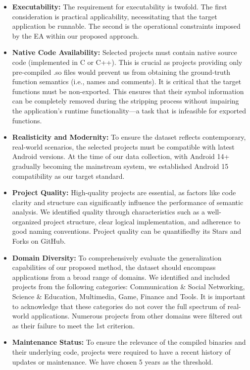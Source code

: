 \documentclass[acmsmall,screen,review,anonymous]{acmart} %
\begin{document}
\begin{itemize}
    \item \textbf{Executability:} The requirement for executability is twofold. The first consideration is practical applicability, necessitating that the target application be runnable. The second is the operational constraints imposed by the EA within our proposed approach.
    
    \item \textbf{Native Code  Availability:} Selected projects must contain native source code (implemented in C or C++). This is crucial as projects providing only pre-compiled .so files would prevent us from obtaining the ground-truth function semantics (i.e., names and comments). It is critical that the target functions must be non-exported. This ensures that their symbol information can be completely removed during the stripping process without impairing the application's runtime functionality—a task that is infeasible for exported functions.

    \item \textbf{Realisticity and Modernity:} To ensure the dataset reflects contemporary, real-world scenarios, the selected projects must be compatible with latest Android versions. At the time of our data collection, with Android 14+ gradually becoming the mainstream system, we established Android 15 compatibility as our target standard.

    \item \textbf{Project Quality:} High-quality projects are essential, as factors like code clarity and structure can significantly influence the performance of semantic analysis. We identified quality through characteristics such as a well-organized project structure, clear logical implementation, and adherence to good naming conventions. Project quality can be quantifiedby its Stars and Forks on GitHub.

    \item \textbf{Domain Diversity:} To comprehensively evaluate the generalization capabilities of our proposed method, the dataset should encompass applications from a broad range of domains. We identified and included projects from the following categories: Communication \& Social Networking,  Science \& Education, Multimedia, Game, Finance and Tools. It is important to acknowledge that these categories do not cover the full spectrum of real-world applications. Numerous projects from other domains were filtered out as their failure to meet the 1st criterion.

    \item \textbf{Maintenance Status:} To ensure the relevance of the compiled binaries and their underlying code, projects were required to have a recent history of updates or maintenance. We have chosen 5 years as the threshold.
\end{itemize}
\end{document}
